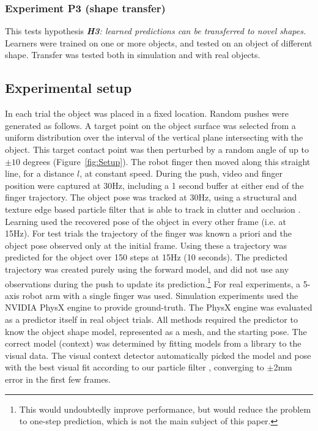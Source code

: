 \subsubsection{Experiment P3 (shape transfer)} This tests hypothesis {\em {\bf H3}: learned predictions can be transferred to novel shapes.} Learners were trained on one or more objects, and tested on an object of different shape. Transfer was tested both in simulation and with real objects.

\subsection{Experimental setup}\label{sec:Experiment.Setup}

In each trial the object was placed in a fixed location. Random pushes were generated as follows. A target point on the object surface was selected from a uniform distribution over the interval of the vertical plane intersecting with the object. This target contact point was then perturbed by a random angle of up to $\pm 10$ degrees (Figure~\ref{fig:Setup}). The robot finger then moved along this straight line, for a distance $l$, at constant speed. During the push, video and finger position were captured at 30Hz, including a 1 second buffer at either end of the finger trajectory. The object pose was tracked at 30Hz, using a structural and texture edge based particle filter that is able to track in clutter and occlusion \citep{morwald_edge_2009}. Learning used the recovered pose of the object in every other frame (i.e. at 15Hz). For test trials the trajectory of the finger was known a priori and the object pose observed only at the initial frame. Using these a trajectory was predicted for the object over 150 steps at 15Hz (10 seconds). The predicted trajectory was created purely using the forward model, and did not use any observations during the push to update its prediction.\footnote{This would undoubtedly improve performance, but would reduce the problem to one-step prediction, which is not the main subject of this paper.} For real experiments, a 5-axis robot arm with a single finger was used. Simulation experiments used the NVIDIA PhysX engine \citep{nvidia_physx} to provide ground-truth. The PhysX engine was evaluated as a predictor itself in real object trials. All methods required the predictor to know the object shape model, represented as a mesh, and the starting pose. The correct model (context) was determined by fitting models from a library to the visual data. The visual context detector automatically picked the model and pose with the best visual fit according to our particle filter \citep{morwald_edge_2009}, converging to $\pm$2mm error in the first few frames. 

